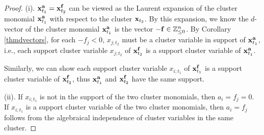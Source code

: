 \documentclass[14pt]{amsart}
\begin{document}
\begin{proof}
(i). ${\bf x}_{t_1}^{\bf a}={\bf x}_{t_2}^{\bf f}$ can be viewed as the Laurent expansion of the cluster monomial ${\bf x}_{t_1}^{\bf a}$ with respect to the cluster ${\bf x}_{t_2}$. By this expansion, we know the $d$-vector of the cluster monomial ${\bf x}_{t_1}^{\bf a}$ is the vector $-{\bf f}\in \mathbb Z_{\leq 0}^n$. By Corollary \ref{thmdvectors}, for each $-f_j<0$, $x_{j;t_2}$ must be a cluster variable in support of ${\bf x}_{t_1}^{\bf a}$, i.e., each support cluster variable $x_{j;t_2}$ of ${\bf x}_{t_2}^{\bf f}$ is a support cluster variable of ${\bf x}_{t_1}^{\bf a}$.

Similarly, we can show each support cluster variable $x_{i;t_1}$ of ${\bf x}_{t_1}^{\bf f}$ is a support cluster variable of ${\bf x}_{t_2}^{\bf f}$, thus  ${\bf x}_{t_1}^{\bf a}$ and ${\bf x}_{t_2}^{\bf f}$ have the same support.

(ii). If $x_{i;t_1}$ is not in the support of the two cluster monomials, then $a_i=f_j=0$.
If $x_{i;t_1}$ is a support cluster variable of the two cluster monomials, then $a_i=f_j$ follows from the algebraical independence of  cluster variables in the same cluster.
\end{proof}
\end{document}

